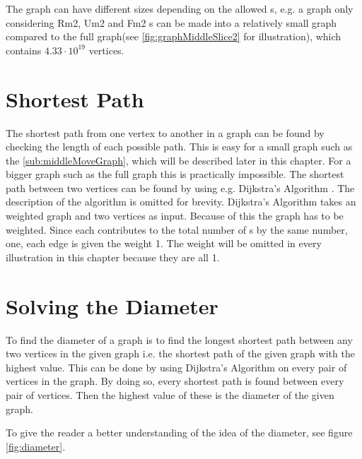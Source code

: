 The \rubik{} graph can have different sizes depending on the allowed \twist{}s, e.g. a graph only considering Rm2, Um2 and Fm2 \twist{}s can be made into a relatively small graph compared to the full \rubik{} graph(see \ref{fig:graphMiddleSlice2} for illustration), which contains $4.33 \cdot 10^{19}$ vertices.


\section{Shortest Path}
The shortest path from one vertex to another in a graph can be found by checking the length of each possible path. 
This is easy for a small graph such as the  \ref{sub:middleMoveGraph}, which will be described later in this chapter. For a bigger graph such as the full \rubik{} graph this is practically impossible. 
The shortest path between two vertices can be found by using e.g. Dijkstra's Algorithm \cite[p. 651]{Rosen07}. The description of the algorithm is omitted for brevity. Dijkstra's Algorithm takes an weighted graph and two vertices as input. 
Because of this the \rubik{} graph has to be weighted. Since each \twist{} contributes to the total number of \twist{}s by the same number, one, each edge is given the weight 1. The weight will be omitted in every illustration in this chapter because they are all 1.  

\section{Solving the Diameter}
To find the diameter of a graph is to find the longest shortest path between any two vertices in the given graph i.e. the shortest path of the given graph with the highest value. 
This can be done by using Dijkstra's Algorithm on every pair of vertices in the graph.
By doing so, every shortest path is found between every pair of vertices.
Then the highest value of these is the diameter of the given graph.

To give the reader a better understanding of the idea of the diameter, see figure \ref{fig:diameter}.

